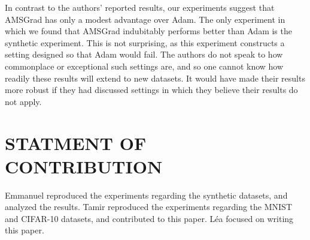 \documentclass[letterpaper, 10 pt, conference]{ieeeconf}  %
\begin{document}
In contrast to the authors' reported results, our experiments suggest that AMSGrad has only a modest advantage over Adam. The only experiment in which we found that AMSGrad indubitably performs better than Adam is the synthetic experiment. This is not surprising, as this experiment constructs a setting designed so that Adam would fail. The authors do not speak to how commonplace or exceptional such settings are, and so one cannot know how readily these results will extend to new datasets. It would have made their results more robust if they had discussed settings in which they believe their results do not apply.

\section{STATMENT OF CONTRIBUTION}

Emmanuel reproduced the experiments regarding the synthetic datasets, and analyzed the results. Tamir reproduced the experiments regarding the MNIST and CIFAR-10 datasets, and contributed to this paper. L\'ea  focused on writing this paper. 
 
\addtolength{\textheight}{-12cm}   %

\end{document}

